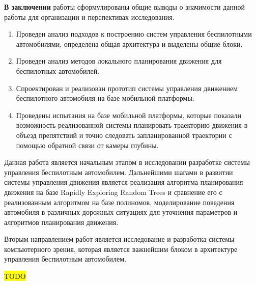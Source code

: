 \textbf{В заключении} работы сформулированы общие выводы о значимости данной работы для
организации и перспективах исследования.

\begin{enumerate}
    \item Проведен анализ подходов к построению систем управления беспилотными
          автомобилями, определена общая архитектура и выделены общие блоки.
    \item Проведен анализ методов локального планирования движения для беспилотных автомобилей.
    \item Спроектирован и реализован прототип системы управления движением беспилотного
          автомобиля на базе мобильной платформы.
    \item Проведены испытания на базе мобильной платформы, которые показали возможность
          реализованной системы планировать траекторию движения в объезд препятствий и
          точно следовать запланированной траектории с помощью обратной связи от камеры глубины.

\end{enumerate}

Данная работа является начальным этапом в исследовании разработке системы управления
беспилотным автомобилем. Дальнейшими шагами в развитии системы управления движения является
реализация алгоритма планирования движения на базе Rapidly Exploring Random Trees и сравнение
его с реализованным алгоритмом на базе полиномов, моделирование поведения автомобиля в
различных дорожных ситуациях для уточнения параметров и алгоритмов планирования движения.

Вторым направлением работ является исследование и разработка системы компьютерного зрения,
которая является важнейшим блоком в архитектуре управления беспилотным автомобилем.

\hl{TODO}

